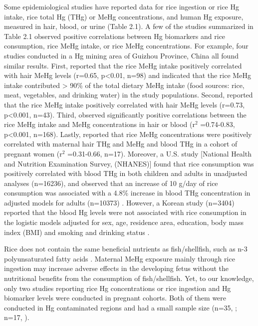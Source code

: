 Some epidemiological studies have reported data for rice ingestion or rice Hg intake, rice total Hg (THg) or MeHg concentrations, and human Hg exposure, measured in hair, blood, or urine (Table 2.1). A few of the studies summarized in Table 2.1 observed positive correlations between Hg biomarkers and rice consumption, rice MeHg intake, or rice MeHg concentrations. For example, four studies conducted in a Hg mining area of Guizhou Province, China all found similar results. First, \cite{feng2007human} reported that the rice MeHg intake positively correlated with hair MeHg levels (r=0.65, p<0.01, n=98) and indicated that the rice MeHg intake contributed > 90\% of the total dietary MeHg intake (food sources: rice, meat, vegetables, and drinking water) in the study populations. Second, \cite{li2011human} reported that the rice MeHg intake positively correlated with hair MeHg levels (r=0.73, p<0.001, n=43). Third, \cite{li2015humanbb} observed significantly positive correlations between the rice MeHg intake and MeHg concentrations in hair or blood (\(\text{r}^{2}\) =0.74-0.83, p<0.001, n=168). Lastly, \cite{rothenberg2013prenatal} reported that rice MeHg concentrations were positively correlated with maternal hair THg and MeHg and blood THg in a cohort of pregnant women (\(\text{r}^{2}\) =0.31-0.66, n=17). Moreover, a U.S. study [National Health and Nutrition Examination Survey, (NHANES)] found that rice consumption was positively correlated with blood THg in both children and adults in unadjusted analyses (n=16236), and observed that an increase of 10 g/day of rice consumption was associated with a 4.8\% increase in blood THg concentration in adjusted models for adults (n=10373) \citep{davis2014dietary}. However, a Korean study (n=3404) reported that the blood Hg levels were not associated with rice consumption in the logistic models adjusted for sex, age, residence area, education, body mass index (BMI) and smoking and drinking status \citep{park2013strong}. 

Rice does not contain the same beneficial nutrients as fish/shellfish, such as n-3 polyunsaturated fatty acids \citep{rothenberg2011low}. Maternal MeHg exposure mainly through rice ingestion may increase adverse effects in the developing fetus without the nutritional benefits from the consumption of fish/shellfish. Yet, to our knowledge, only two studies \citep{maramba2006environmental, rothenberg2013prenatal} reporting rice Hg concentrations or rice ingestion and Hg biomarker levels were conducted in pregnant cohorts. Both of them were conducted in Hg contaminated regions and had a small sample size (n=35, \citep{maramba2006environmental}; n=17, \citep{rothenberg2013prenatal}).

